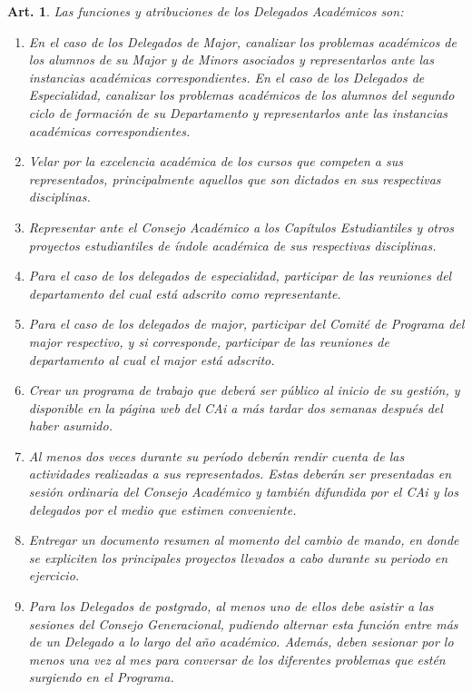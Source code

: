 \documentclass[letterpaper,11pt]{article}
\theoremstyle{plain}
\newtheorem{art}{Art.} %
\begin{document}
		\begin{art}\label{funcionesDelegadosAcademicos}
			Las funciones y atribuciones de los Delegados Académicos son:
			\begin{enumerate}
				\item En el caso de los Delegados de Major, canalizar los problemas académicos de los alumnos de su Major y de Minors asociados y representarlos ante las instancias académicas correspondientes. En el caso de los Delegados de Especialidad, canalizar los problemas académicos de los alumnos del segundo ciclo de formación de su Departamento y representarlos ante las instancias académicas correspondientes.
				\item Velar por la excelencia académica de los cursos que competen a sus representados, principalmente aquellos que son dictados en sus respectivas disciplinas.
				\item Representar ante el Consejo Académico a los Capítulos Estudiantiles y otros proyectos estudiantiles de índole académica de sus respectivas disciplinas.
				\item Para el caso de los delegados de especialidad, participar de las reuniones del departamento del cual está adscrito como representante.
				\item Para el caso de los delegados de major, participar del  Comité de Programa del major respectivo, y si corresponde, participar de las reuniones de departamento al cual el major está adscrito.
				\item Crear un programa de trabajo que deberá ser público al inicio de su gestión, y disponible en la página web del CAi a más tardar dos semanas después del haber asumido.
				\item Al menos dos veces durante su período deberán rendir cuenta de las actividades realizadas a sus representados. Estas deberán ser presentadas en sesión ordinaria del Consejo Académico y también difundida por el CAi  y los delegados por el medio que estimen conveniente.
				\item Entregar un documento resumen al momento del cambio de mando, en donde se expliciten los principales proyectos llevados a cabo durante su periodo en ejercicio.
				\item Para los Delegados de postgrado, al menos uno de ellos debe asistir a las sesiones del Consejo Generacional, pudiendo alternar esta función entre más de un Delegado a lo largo del año académico. Además, deben sesionar por lo menos una vez al mes para conversar de los diferentes problemas que estén surgiendo en el Programa.
			\end{enumerate}
		\end{art}
\end{document}
